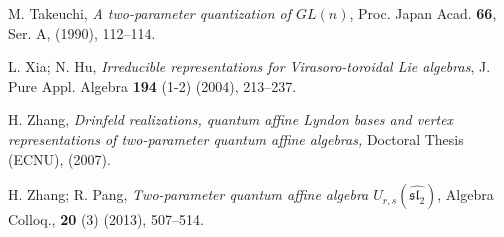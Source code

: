 \documentclass{amsproc}
\theoremstyle{remark}
\numberwithin{equation}{section}
\begin{document}
\begin{thebibliography}{15}
  M. Takeuchi, \textit{A two-parameter quantization of
$GL(n)$}, Proc. Japan Acad. \textbf{66}, Ser. A, (1990), 112--114.

 L. Xia; N. Hu, \textit{Irreducible representations for
Virasoro-toroidal Lie algebras}, J. Pure Appl. Algebra \textbf{194}
(1-2) (2004),  213--237.

 H. Zhang, \textit{Drinfeld realizations, quantum affine Lyndon bases and vertex representations
 of two-parameter quantum affine algebras,}  Doctoral Thesis (ECNU),
 (2007).

 H. Zhang; R. Pang, \textit{Two-parameter quantum affine algebra $U_{r,s}(\widehat{\mathfrak{sl}_2})$}, Algebra Colloq., \textbf{20} (3) (2013), 507--514.

\end{thebibliography}
\end{document}
